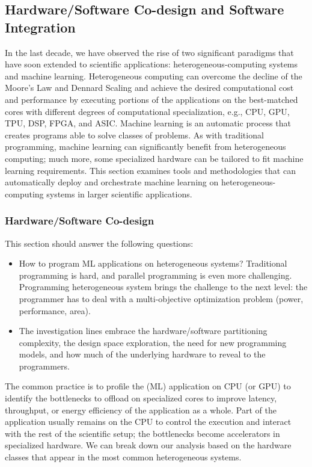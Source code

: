 \subsection{Hardware/Software Co-design and Software Integration}

In the last decade, we have observed the rise of two significant paradigms that have soon extended to scientific applications: heterogeneous-computing systems and machine learning. Heterogeneous computing can overcome the decline of the Moore's Law and Dennard Scaling and achieve the desired computational cost and performance by executing portions of the applications on the best-matched cores with different degrees of computational specialization, e.g., CPU, GPU, TPU, DSP, FPGA, and ASIC. Machine learning is an automatic process that creates programs able to solve classes of problems. As with traditional programming, machine learning can significantly benefit from heterogeneous computing; much more, some specialized hardware can be tailored to fit machine learning requirements. This section examines tools and methodologies that can automatically deploy and orchestrate machine learning on heterogeneous-computing systems in larger scientific applications.

\subsubsection{Hardware/Software Co-design}
This section should answer the following questions:
\begin{itemize}
\item How to program ML applications on heterogeneous systems? Traditional programming is hard, and parallel programming is even more challenging. Programming heterogeneous system brings the challenge to the next level: the programmer has to deal with a multi-objective optimization problem (power, performance, area).
\item The investigation lines embrace the hardware/software partitioning complexity, the design space exploration, the need for new programming models, and how much of the underlying hardware to reveal to the programmers.
\end{itemize}
The common practice is to profile the (ML) application on CPU (or GPU) to identify the bottlenecks to offload on specialized cores to improve latency, throughput, or energy efficiency of the application as a whole. Part of the application usually remains on the CPU to control the execution and interact with the rest of the scientific setup; the bottlenecks become accelerators in specialized hardware. We can break down our analysis based on the hardware classes that appear in the most common heterogeneous systems. \\

